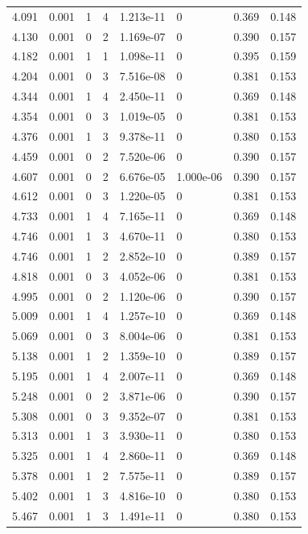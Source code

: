 \documentclass[preview]{standalone}
\begin{document}
{{{\begin{tabular}{L{1.2cm}C{1.2cm} C{0.3cm}C{0.5cm} C{1.4cm}C{1.4cm} C{1.4cm}C{1.4cm}}
  4.091  &  0.001  & 1     &  4 &  1.213e-11  & 0  & 0.369 &  0.148   \\ 
  4.130  &  0.001  & 0     &  2 &  1.169e-07  & 0  & 0.390 &  0.157   \\ 
  4.182  &  0.001  & 1     &  1 &  1.098e-11  & 0  & 0.395 &  0.159   \\ 
  4.204  &  0.001  & 0     &  3 &  7.516e-08  & 0  & 0.381 &  0.153   \\ 
  4.344  &  0.001  & 1     &  4 &  2.450e-11  & 0  & 0.369 &  0.148   \\ 
  4.354  &  0.001  & 0     &  3 &  1.019e-05  & 0  & 0.381 &  0.153   \\ 
  4.376  &  0.001  & 1     &  3 &  9.378e-11  & 0  & 0.380 &  0.153   \\ 
  4.459  &  0.001  & 0     &  2 &  7.520e-06  & 0  & 0.390 &  0.157   \\ 
  4.607  &  0.001  & 0     &  2 &  6.676e-05  & 1.000e-06  & 0.390 &  0.157   \\ 
  4.612  &  0.001  & 0     &  3 &  1.220e-05  & 0  & 0.381 &  0.153   \\ 
  4.733  &  0.001  & 1     &  4 &  7.165e-11  & 0  & 0.369 &  0.148   \\ 
  4.746  &  0.001  & 1     &  3 &  4.670e-11  & 0  & 0.380 &  0.153   \\ 
  4.746  &  0.001  & 1     &  2 &  2.852e-10  & 0  & 0.389 &  0.157   \\ 
  4.818  &  0.001  & 0     &  3 &  4.052e-06  & 0  & 0.381 &  0.153   \\ 
  4.995  &  0.001  & 0     &  2 &  1.120e-06  & 0  & 0.390 &  0.157   \\ 
  5.009  &  0.001  & 1     &  4 &  1.257e-10  & 0  & 0.369 &  0.148   \\ 
  5.069  &  0.001  & 0     &  3 &  8.004e-06  & 0  & 0.381 &  0.153   \\ 
  5.138  &  0.001  & 1     &  2 &  1.359e-10  & 0  & 0.389 &  0.157   \\ 
  5.195  &  0.001  & 1     &  4 &  2.007e-11  & 0  & 0.369 &  0.148   \\ 
  5.248  &  0.001  & 0     &  2 &  3.871e-06  & 0  & 0.390 &  0.157   \\ 
  5.308  &  0.001  & 0     &  3 &  9.352e-07  & 0  & 0.381 &  0.153   \\ 
  5.313  &  0.001  & 1     &  3 &  3.930e-11  & 0  & 0.380 &  0.153   \\ 
  5.325  &  0.001  & 1     &  4 &  2.860e-11  & 0  & 0.369 &  0.148   \\ 
  5.378  &  0.001  & 1     &  2 &  7.575e-11  & 0  & 0.389 &  0.157   \\ 
  5.402  &  0.001  & 1     &  3 &  4.816e-10  & 0  & 0.380 &  0.153   \\ 
  5.467  &  0.001  & 1     &  3 &  1.491e-11  & 0  & 0.380 &  0.153   \\ 
\hline 
\end{tabular} 

}}}
\end{document}
